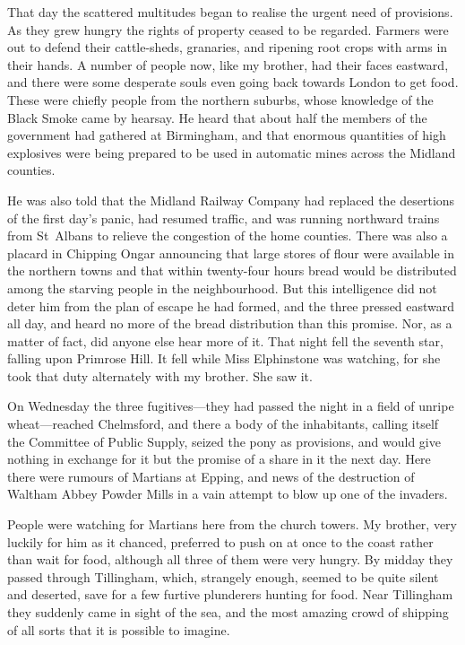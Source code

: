 That day the scattered multitudes began to realise the urgent need of provisions. As they grew hungry the rights of property ceased to be regarded. Farmers were out to defend their cattle-sheds, granaries, and ripening root crops with arms in their hands. A number of people now, like my brother, had their faces eastward, and there were some desperate souls even going back towards London to get food. These were chiefly people from the northern suburbs, whose knowledge of the Black Smoke came by hearsay. He heard that about half the members of the government had gathered at Birmingham, and that enormous quantities of high explosives were being prepared to be used in automatic mines across the Midland counties.

He was also told that the Midland Railway Company had replaced the desertions of the first day's panic, had resumed traffic, and was running northward trains from St~Albans to relieve the congestion of the home counties. There was also a placard in Chipping Ongar announcing that large stores of flour were available in the northern towns and that within twenty-four hours bread would be distributed among the starving people in the neighbourhood. \label{broexp3}But this intelligence did not deter him from the plan of escape he had formed, and the three pressed eastward all day, and heard no more of the bread distribution than this promise. Nor, as a matter of fact, did anyone else hear more of it. That night fell the seventh star, falling upon Primrose Hill.\label{cylinder7} It fell while Miss Elphinstone was watching, for she took that duty alternately with my brother. She saw it.

On Wednesday the three fugitives—they had passed the night in a field of unripe wheat—reached Chelmsford, \label{broexp4b} and there a body of the inhabitants, calling itself the Committee of Public Supply, seized the pony as provisions, and would give nothing in exchange for it but the promise of a share in it the next day. Here there were rumours of Martians at Epping, and news of the destruction of Waltham Abbey Powder Mills in a vain attempt to blow up one of the invaders.

People were watching for Martians here from the church towers. My brother, very luckily for him as it chanced, preferred to push on at once to the coast rather than wait for food, although all three of them were very hungry. By midday they passed through Tillingham, which, strangely enough, seemed to be quite silent and deserted, save for a few furtive plunderers hunting for food. \label{broexp5a} Near Tillingham they suddenly came in sight of the sea, and the most amazing crowd of shipping of all sorts that it is possible to imagine.

